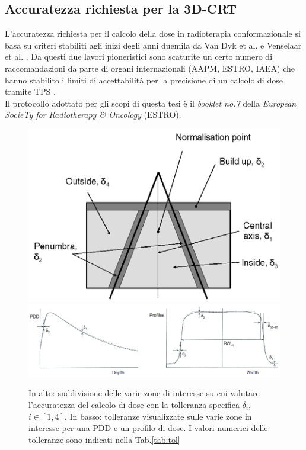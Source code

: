 \subsection{Accuratezza richiesta per la 3D-CRT}
\label{sec:accu_3D}
L'accuratezza richiesta per il calcolo della dose in radioterapia conformazionale si basa su criteri stabiliti agli inizi degli anni duemila da Van Dyk et al. e Venselaar et al. \cite{Dyk1993,Venselaar2001}. Da questi due lavori pioneristici sono scaturite un certo numero di raccomandazioni da parte di organi internazionali (AAPM, ESTRO, IAEA) che hanno stabilito i limiti di accettabilità per la precisione di un calcolo di dose tramite TPS \cite{Fraass1998,Mijnheer2004,IAEA430}.\\
Il protocollo adottato per gli scopi di questa tesi è il \textit{booklet no.7} della \textit{European SocieTy for Radiotherapy \& Oncology} (ESTRO). 
\begin{figure}[!t]
\centering
\includegraphics[width=.65\textwidth]{./cap2/Accuracy_zones.png}\\\vspace{.3cm}
\includegraphics[width=\textwidth]{./cap2/Accuracy_pdd_prof.png}
\caption{In alto: suddivisione delle varie zone di interesse su cui valutare l'accuratezza del calcolo di dose con la tolleranza specifica $\delta_i$, $i\in[1,4]$. In basso: tolleranze visualizzate sulle varie zone in interesse per una PDD e un profilo di dose. I valori numerici delle tolleranze sono indicati nella Tab.\ref{tab:tol}}
\label{fig:accuracy_zones}
\end{figure}

